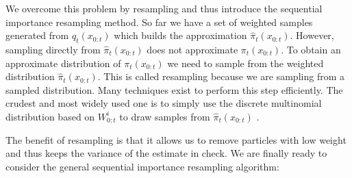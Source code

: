We overcome this problem by resampling and thus introduce the sequential importance resampling method. So far we have a set of weighted samples generated from $q_t(x_{0:t})$ which builds the approximation $\hat{\pi}_t(x_{0:t})$. However, sampling directly from $\hat{\pi}_t(x_{0:t})$ does not approximate $\pi_t(x_{0:t})$. To obtain an approximate distribution of $\pi_t(x_{0:t})$ we need to sample from the weighted distribution $\hat{\pi}_t(x_{0:t})$. This is called resampling because we are sampling from a sampled distribution. Many techniques exist to perform this step efficiently. The crudest and most widely used one is to simply use the discrete multinomial distribution based on $W^i_{0:t}$ to draw samples from $\hat{\pi}_t(x_{0:t})$ \cite{pftut}. 

The benefit of resampling is that it allows us to remove particles with low weight and thus keeps the variance of the estimate in check. We are finally ready to consider the general sequential importance resampling algorithm:

